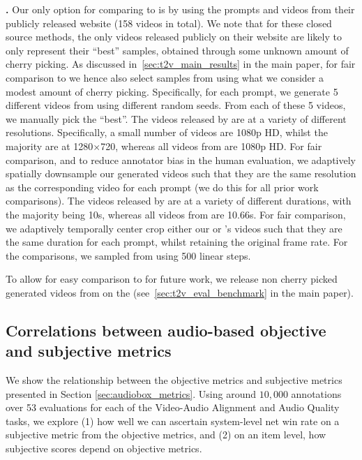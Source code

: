 \textbf{\Sora. }
Our only option for comparing to \Sora is by using the prompts and videos from their publicly released website (158 videos in total).
We note that for these closed source methods, the only videos released publicly on their website are likely to only represent their ``best'' samples, obtained through some unknown amount of cherry picking.
As discussed in~\cref{sec:t2v_main_results} in the main paper, for fair comparison to \Sora we hence also select samples from \OursVideo using what we consider a modest amount of cherry picking.
Specifically, for each prompt, we generate 5 different videos from \OursVideo using different random seeds.
From each of these 5 videos, we manually pick the ``best''.
The videos released by \Sora are at a variety of different resolutions.
Specifically, a small number of videos are 1080p HD, whilst the majority are at 1280$\times$720, whereas all videos from \OursVideo are 1080p HD.
For fair comparison, and to reduce annotator bias in the human evaluation, we adaptively spatially downsample our generated videos such that they are the same resolution as the corresponding \Sora video for each prompt (we do this for all prior work comparisons).
The videos released by \Sora are at a variety of different durations, with the majority being 10s, whereas all videos from \OursVideo are 10.66s.
For fair comparison, we adaptively temporally center crop either our or \Sora's videos such that they are the same duration for each prompt, whilst retaining the original frame rate.
For the \Sora comparisons, we sampled from \OursVideo using 500 linear steps.

To allow for easy comparison to \OursVideo for future work, we release non cherry picked generated videos from \OursVideo on the \textToVBenchmarkName (see~\cref{sec:t2v_eval_benchmark} in the main paper).


\subsection{Correlations between audio-based objective and subjective metrics}\label{sec:app_audio_metric_corr}
\label{sec:app-audio-corr}


We show the relationship between the objective metrics and subjective metrics presented in Section \ref{sec:audiobox_metrics}. Using around $10,000$ annotations over 53 evaluations for each of the Video-Audio Alignment and Audio Quality tasks, we explore (1) how well we can ascertain system-level net win rate on a subjective metric from the objective metrics, and (2) on an item level, how subjective scores depend on objective metrics.

